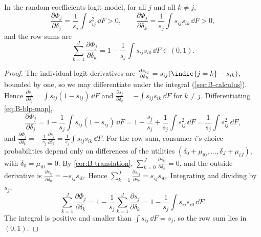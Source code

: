 \begin{proposition}\label{prop:B-blp-rowsum}
In the random coefficients logit model, for all $j$ and all $k \neq j$,
\begin{equation*}
  \frac{\partial\Phi_j}{\partial\delta_j} = \frac{1}{s_j}\int s_{ij}^2\,\dd F > 0, \qquad
  \frac{\partial\Phi_j}{\partial\delta_k} = \frac{1}{s_j}\int s_{ij}s_{ik}\,\dd F > 0,
\end{equation*}
and the row sums are
\begin{equation}\label{eq:B-blp-rowsum}
  \sum_{k=1}^{J}\frac{\partial\Phi_j}{\partial\delta_k} = 1 - \frac{1}{s_j}\int s_{ij}s_{i0}\,\dd F \in (0, 1).
\end{equation}
\end{proposition}

\begin{proof}
The individual logit derivatives are $\frac{\partial s_{ij}}{\partial\delta_k} = s_{ij}(\indic\{j = k\} -
s_{ik})$, bounded by one, so we may differentiate under the integral (\cref{sec:B-calculus}). Hence
$\frac{\partial s_j}{\partial\delta_j} = \int s_{ij}(1 - s_{ij})\,\dd F$ and $\frac{\partial
s_j}{\partial\delta_k} = -\int s_{ij}s_{ik}\,\dd F$ for $k \neq j$. Differentiating \eqref{eq:B-blp-map},
\begin{equation*}
  \frac{\partial\Phi_j}{\partial\delta_j} = 1 - \frac{1}{s_j}\int s_{ij}(1 - s_{ij})\,\dd F
  = 1 - \frac{s_j}{s_j} + \frac{1}{s_j}\int s_{ij}^2\,\dd F = \frac{1}{s_j}\int s_{ij}^2\,\dd F,
\end{equation*}
and $\frac{\partial\Phi_j}{\partial\delta_k} = -\frac{1}{s_j}\frac{\partial s_j}{\partial\delta_k} =
\frac{1}{s_j}\int s_{ij}s_{ik}\,\dd F$. For the row sum, consumer $i$'s choice probabilities depend only on
differences of the utilities $(\delta_0 + \mu_{i0}, \dots, \delta_J + \mu_{iJ})$, with $\delta_0 = \mu_{i0} = 0$.
By \cref{cor:B-translation}, $\sum_{k=0}^{J}\frac{\partial s_{ij}}{\partial\delta_k} = 0$, and the outside
derivative is $\frac{\partial s_{ij}}{\partial\delta_0} = -s_{ij}s_{i0}$. Hence $\sum_{k=1}^{J}\frac{\partial
s_{ij}}{\partial\delta_k} = s_{ij}s_{i0}$. Integrating and dividing by $s_j$,
\begin{equation*}
  \sum_{k=1}^{J}\frac{\partial\Phi_j}{\partial\delta_k} = 1 - \frac{1}{s_j}\sum_{k=1}^{J}\frac{\partial
  s_j}{\partial\delta_k} = 1 - \frac{1}{s_j}\int s_{ij}s_{i0}\,\dd F.
\end{equation*}
The integral is positive and smaller than $\int s_{ij}\,\dd F = s_j$, so the row sum lies in $(0,1)$.
\end{proof}

